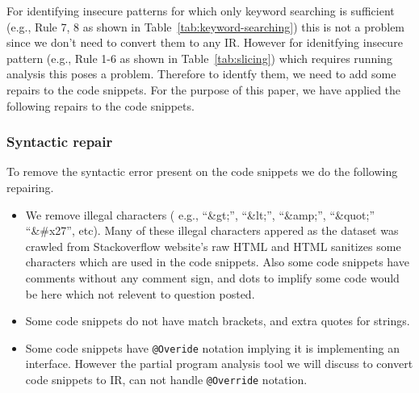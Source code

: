 For identifying insecure patterns for which only keyword searching is sufficient (e.g., Rule 7, 8 as shown in Table~\ref{tab:keyword-searching}) 
this is not a problem since we don't need to convert them to any IR. However for idenitfying insecure pattern (e.g., Rule 1-6 as shown in
 Table~\ref{tab:slicing}) which requires running analysis this poses a problem. Therefore to identfy them, we need to add some 
 repairs to the code snippets. For the purpose of this paper, we have applied the following repairs to the code snippets.

\subsubsection{Syntactic repair}
To remove the syntactic error present on the code snippets we do the following repairing.
  \begin{itemize}
    \item We remove illegal characters ( e.g., ``\&gt;'', ``\&lt;'', ``\&amp;'', ``\&quot;'' ``\&\#x27'', etc). Many of these illegal
     characters appered as the dataset was crawled from Stackoverflow website's raw HTML and HTML sanitizes some characters which are used 
     in the code snippets. Also some code snippets have comments without any comment sign, and dots to implify some code would be here which not 
     relevent to question posted.    
    \item Some code snippets do not have match brackets, and extra quotes for strings. 
    \item Some code snippets have \texttt{@Overide} notation implying it is implementing an interface. However the partial program analysis 
    tool we will discuss to convert code snippets to IR, can not handle \texttt{@Override} notation.
  \end{itemize}
     

